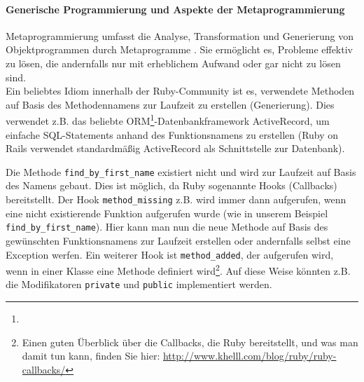 \paragraph{Generische Programmierung und Aspekte der Metaprogrammierung}
Metaprogrammierung umfasst die Analyse, Transformation und Generierung von Objektprogrammen durch Metaprogramme \citep{herrmann_2005}.  Sie ermöglicht es, Probleme effektiv zu lösen, die andernfalls nur mit erheblichem Aufwand oder gar nicht zu lösen sind.\\
Ein beliebtes Idiom innerhalb der Ruby-Community ist es, verwendete Methoden auf Basis des Methodennamens zur Laufzeit zu erstellen (Generierung). Dies verwendet z.B. das beliebte ORM\footnote{}-Datenbankframework ActiveRecord, um einfache SQL-Statements anhand des Funktionsnamens zu erstellen (Ruby on Rails verwendet standardmäßig ActiveRecord als Schnittstelle zur Datenbank).
\begin{ruby}[label=IRB]
\end{ruby}


Die Methode \texttt{find\_by\_first\_name} existiert nicht und wird zur Laufzeit auf Basis des Namens gebaut. Dies ist möglich, da Ruby sogenannte Hooks (Callbacks) bereitstellt. Der Hook \texttt{method\_missing} z.B. wird immer dann aufgerufen, wenn eine nicht existierende Funktion aufgerufen wurde (wie in unserem Beispiel \texttt{find\_by\_first\_name}). Hier kann man nun die neue Methode auf Basis des gewünschten Funktionsnamens zur Laufzeit erstellen oder andernfalls selbst eine Exception werfen. Ein weiterer Hook ist \texttt{method\_added}, der aufgerufen wird, wenn in einer Klasse eine Methode definiert wird\footnote{Einen guten Überblick über die Callbacks, die Ruby bereitstellt, und was man damit tun kann, finden Sie hier: \url{http://www.khelll.com/blog/ruby/ruby-callbacks/}}. Auf diese Weise könnten z.B. die Modifikatoren \texttt{private} und \texttt{public} implementiert werden.

